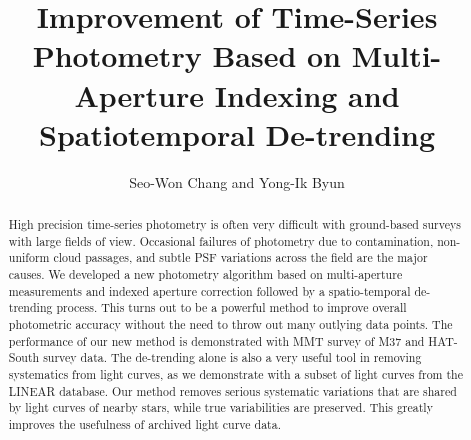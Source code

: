 
\resetcounters



\title{Improvement of Time-Series Photometry Based on Multi-Aperture
Indexing and Spatiotemporal De-trending}
\author{Seo-Won Chang and Yong-Ik Byun}


\begin{abstract}
High precision time-series photometry is often very difficult with ground-based surveys with large fields of view.  Occasional failures of photometry due to contamination, non-uniform cloud passages, and subtle PSF variations across the field are the major causes.  We developed a new photometry algorithm based on multi-aperture measurements and indexed aperture correction followed by a spatio-temporal de-trending process.  This turns out to be a powerful method to improve overall photometric accuracy without the need to throw out many outlying data points.  The performance of our new method is demonstrated with MMT survey of M37 and HAT-South survey data.  The de-trending alone is also a very useful tool in removing systematics from light curves, as we demonstrate with a subset of light curves from the LINEAR database.  Our method removes serious systematic variations that are shared by light curves of nearby stars, while true variabilities are preserved.  This greatly improves the usefulness of archived light curve data.
\end{abstract}


